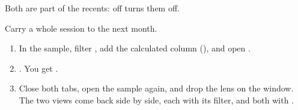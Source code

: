 Both are part of the recents:  off turns them off.

\begin{tryit}
Carry a whole session to the next month.
\begin{enumerate}
\item In the sample, filter , add the calculated column  (), and open .
\item {}. You get .
\item Close both tabs, open the sample again, and drop the lens on the window. The two views come back
side by side, each with its filter, and both with .
\end{enumerate}
\end{tryit}
